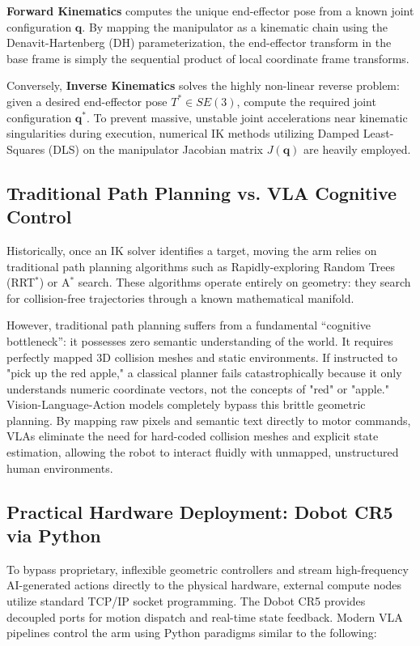 \textbf{Forward Kinematics} computes the unique end-effector pose from a known joint configuration $\mathbf{q}$. By mapping the manipulator as a kinematic chain using the Denavit-Hartenberg (DH) parameterization, the end-effector transform in the base frame is simply the sequential product of local coordinate frame transforms.

Conversely, \textbf{Inverse Kinematics} solves the highly non-linear reverse problem: given a desired end-effector pose $T^* \in SE(3)$, compute the required joint configuration $\mathbf{q}^*$. To prevent massive, unstable joint accelerations near kinematic singularities during execution, numerical IK methods utilizing Damped Least-Squares (DLS) on the manipulator Jacobian matrix $J(\mathbf{q})$ are heavily employed.

\subsection{Traditional Path Planning vs. VLA Cognitive Control}

Historically, once an IK solver identifies a target, moving the arm relies on traditional path planning algorithms such as Rapidly-exploring Random Trees (RRT$^*$) or A$^*$ search. These algorithms operate entirely on geometry: they search for collision-free trajectories through a known mathematical manifold. 

However, traditional path planning suffers from a fundamental ``cognitive bottleneck'': it possesses zero semantic understanding of the world. It requires perfectly mapped 3D collision meshes and static environments. If instructed to "pick up the red apple," a classical planner fails catastrophically because it only understands numeric coordinate vectors, not the concepts of "red" or "apple." Vision-Language-Action models completely bypass this brittle geometric planning. By mapping raw pixels and semantic text directly to motor commands, VLAs eliminate the need for hard-coded collision meshes and explicit state estimation, allowing the robot to interact fluidly with unmapped, unstructured human environments.

\subsection{Practical Hardware Deployment: Dobot CR5 via Python}

To bypass proprietary, inflexible geometric controllers and stream high-frequency AI-generated actions directly to the physical hardware, external compute nodes utilize standard TCP/IP socket programming. The Dobot CR5 provides decoupled ports for motion dispatch and real-time state feedback. Modern VLA pipelines control the arm using Python paradigms similar to the following:

